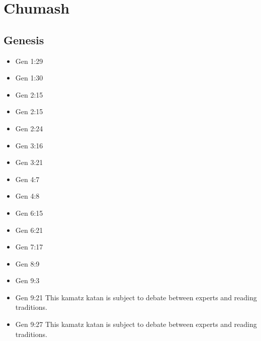 \documentclass[14pt]{article}
\begin{document}
	


\section{Chumash}

\subsection{Genesis}
\begin{multicols}{2}
\begin{itemize} \item Gen 1:29

\item Gen 1:30

\item Gen 2:15

\item Gen 2:15

\item Gen 2:24

\item Gen 3:16

\item Gen 3:21

\item Gen 4:7

\item Gen 4:8

\item Gen 6:15

\item Gen 6:21

\item Gen 7:17

\item Gen 8:9

\item Gen 9:3

\item Gen 9:21 This kamatz katan is subject to debate between experts and reading traditions.

\item Gen 9:27 This kamatz katan is subject to debate between experts and reading traditions.


\end{itemize}
\end{multicols}
\end{document}
